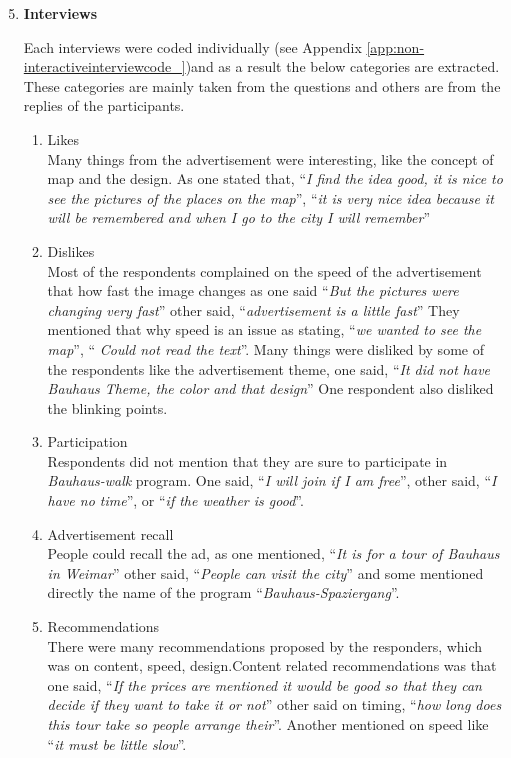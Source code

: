\begin{enumerate}
\setcounter{enumi}{4}

\item \textbf{Interviews} 

Each interviews were coded individually (see Appendix \ref{app:non-interactiveinterviewcode_})and as a result the below categories are extracted. These categories are mainly taken from the questions and others are from the replies of the participants.


\begin{enumerate}
\item Likes \\
Many things from the advertisement were interesting, like the concept of map and the design. As one stated that, ``\emph{I find the idea good, it is nice to see the pictures of the places on the map}'', ``\emph{it is very nice idea because it will be remembered and when I go to the city I will remember}''

\item Dislikes \\
Most of the respondents complained on the speed of the advertisement that how fast the image changes as one said ``\emph{But the pictures were changing very fast}'' other said, ``\emph{advertisement is a little fast}'' They mentioned that why speed is an issue as stating, ``\emph{we wanted to see the map}'', ``\emph{ Could not read the text}''. Many things were disliked by some of the respondents like the advertisement theme, one said, ``\emph{It did not have Bauhaus Theme, the color and that design}'' One respondent also disliked the blinking points.

\item  Participation \\
Respondents did not mention that they are sure to participate in  \emph{Bauhaus-walk} program. One said, ``\emph{I will join if I am free}'', other said, ``\emph{I have no time}'', or ``\emph{if the weather is good}''.

\item  Advertisement recall \\
People could recall the ad, as one mentioned, ``\emph{It is for a tour of Bauhaus in Weimar}'' other said, ``\emph{People can visit the city}'' and some mentioned directly the name of the program ``\emph{Bauhaus-Spaziergang}''.

\item Recommendations \\
There were many recommendations proposed by the responders, which was on content, speed, design.Content related recommendations was that one said, ``\emph{If the prices are mentioned it would be good so that they can decide if they want to take it or not}'' other said on timing, ``\emph{how long does this tour take so people arrange their}''. Another mentioned on speed like ``\emph{it must be little slow}''.


\end{enumerate}
\end{enumerate}
